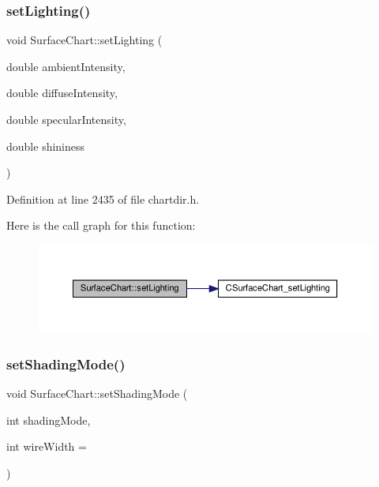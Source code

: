\subsubsection{\texorpdfstring{set\+Lighting()}{setLighting()}}
{\footnotesize\ttfamily void Surface\+Chart\+::set\+Lighting (\begin{DoxyParamCaption}\item[{double}]{ambient\+Intensity,  }\item[{double}]{diffuse\+Intensity,  }\item[{double}]{specular\+Intensity,  }\item[{double}]{shininess }\end{DoxyParamCaption})\hspace{0.3cm}{\ttfamily [inline]}}



Definition at line 2435 of file chartdir.\+h.

Here is the call graph for this function\+:
\nopagebreak
\begin{figure}[H]
\begin{center}
\leavevmode
\includegraphics[width=350pt]{class_surface_chart_a6d1f1a35b9008f3d1352a9b2d335196c_cgraph}
\end{center}
\end{figure}
\mbox{\label{class_surface_chart_afde084d320bd98c83da03762f134ed59}} 
\subsubsection{\texorpdfstring{set\+Shading\+Mode()}{setShadingMode()}}
{\footnotesize\ttfamily void Surface\+Chart\+::set\+Shading\+Mode (\begin{DoxyParamCaption}\item[{int}]{shading\+Mode,  }\item[{int}]{wire\+Width = {} }\end{DoxyParamCaption})\hspace{0.3cm}{\ttfamily [inline]}}



